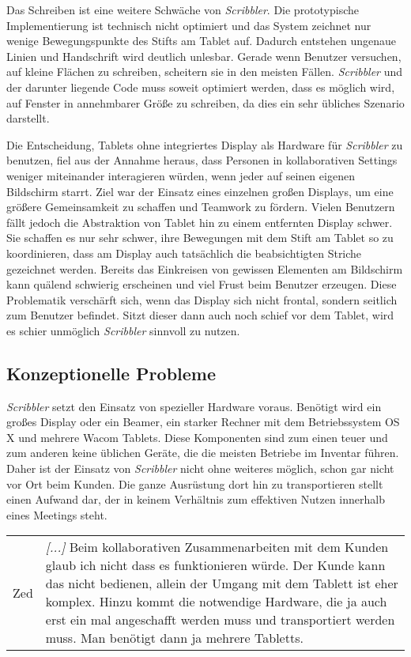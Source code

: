 \medskip Das Schreiben ist eine weitere Schwäche von \emph{Scribbler}. Die prototypische Implementierung ist technisch nicht optimiert und das System zeichnet nur wenige Bewegungspunkte des Stifts am Tablet auf. Dadurch entstehen ungenaue Linien und Handschrift wird deutlich unlesbar. Gerade wenn Benutzer versuchen, auf kleine Flächen zu schreiben, scheitern sie in den meisten Fällen. \emph{Scribbler} und der darunter liegende Code muss soweit optimiert werden, dass es möglich wird, auf Fenster in annehmbarer Größe zu schreiben, da dies ein sehr übliches Szenario darstellt.

\medskip Die Entscheidung, Tablets ohne integriertes Display als Hardware für \emph{Scribbler} zu benutzen, fiel aus der Annahme heraus, dass Personen in kollaborativen Settings weniger miteinander interagieren würden, wenn jeder auf seinen eigenen Bildschirm starrt. Ziel war der Einsatz eines einzelnen großen Displays, um eine größere Gemeinsamkeit zu schaffen und Teamwork zu fördern. Vielen Benutzern fällt jedoch die Abstraktion von Tablet hin zu einem entfernten Display schwer. Sie schaffen es nur sehr schwer, ihre Bewegungen mit dem Stift am Tablet so zu koordinieren, dass am Display auch tatsächlich die beabsichtigten Striche gezeichnet werden. Bereits das Einkreisen von gewissen Elementen am Bildschirm kann quälend schwierig erscheinen und viel Frust beim Benutzer erzeugen. Diese Problematik verschärft sich, wenn das Display sich nicht frontal, sondern seitlich zum Benutzer befindet. Sitzt dieser dann auch noch schief vor dem Tablet, wird es schier unmöglich \emph{Scribbler} sinnvoll zu nutzen.

\subsection{Konzeptionelle Probleme}
\emph{Scribbler} setzt den Einsatz von spezieller Hardware voraus. Benötigt wird ein großes Display oder ein Beamer, ein starker Rechner mit dem Betriebssystem OS X und mehrere Wacom Tablets. Diese Komponenten sind zum einen teuer und zum anderen keine üblichen Geräte, die die meisten Betriebe im Inventar führen. Daher ist der Einsatz von \emph{Scribbler} nicht ohne weiteres möglich, schon gar nicht vor Ort beim Kunden. Die ganze Ausrüstung dort hin zu transportieren stellt einen Aufwand dar, der in keinem Verhältnis zum effektiven Nutzen innerhalb eines Meetings steht.

\begin{extract}[Notwendige Hardware schränkt ein.]
	{
		\myfloatalign
		\begin{tabularx}{\textwidth}{p{1cm}X}
			Zed & \emph{[...]} Beim kollaborativen Zusammenarbeiten mit dem Kunden glaub ich nicht dass es funktionieren würde. Der Kunde kann das nicht bedienen, allein der Umgang mit dem Tablett ist eher komplex. Hinzu kommt die notwendige Hardware, die ja auch erst ein mal angeschafft werden muss und transportiert werden muss. Man benötigt dann ja mehrere Tabletts. 
		\end{tabularx}
	}
\end{extract}

